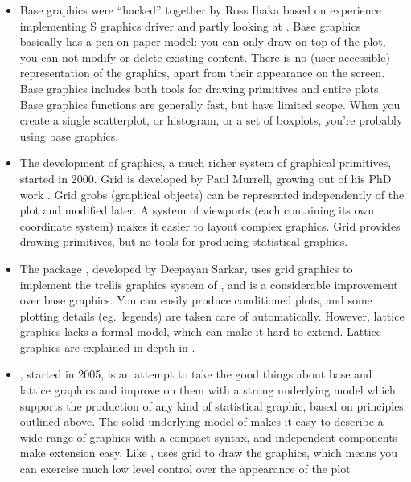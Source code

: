 \begin{itemize} 
	\item Base graphics were ``hacked'' together by Ross Ihaka based on experience implementing S graphics driver and partly looking at \cite{chambers:1983}.  Base graphics basically has a pen on paper model: you can only draw on top of the plot, you can not modify or delete existing content.  There is no (user accessible) representation of the graphics, apart from their appearance on the screen. Base graphics includes both tools for drawing primitives and entire plots.  Base graphics functions are generally fast, but have limited scope. When you create a single scatterplot, or histogram, or a set of boxplots, you're probably using base graphics.

	\item The development of  graphics, a much richer system of graphical primitives, started in 2000.  Grid is developed by Paul Murrell, growing out of his PhD work \citep{murrell:1998}. Grid grobs (graphical objects) can be represented independently of the plot and modified later. A system of viewports (each containing its own coordinate system) makes it easier to layout complex graphics. Grid provides drawing primitives, but no tools for producing statistical graphics.  

	\item The  package \citep{lattice}, developed by Deepayan Sarkar, uses grid graphics to implement the trellis graphics system of \citet{cleveland:1993,cleveland:1994}, and is a considerable improvement over base graphics.  You can easily produce conditioned plots, and some plotting details (eg.\ legends) are taken care of automatically.  However, lattice graphics lacks a formal model, which can make it hard to extend.  Lattice graphics are explained in depth in \citep{sarkar:2008}.

	\item \ggplot, started in 2005, is an attempt to take the good things about base and lattice graphics and improve on them with a strong underlying model which supports the production of any kind of statistical graphic, based on principles outlined above.  The solid underlying model of \ggplot makes it easy to describe a wide range of graphics with a compact syntax, and independent components make extension easy.  Like , \ggplot uses grid to draw the graphics, which means you can exercise much low level control over the appearance of the plot

\end{itemize}

